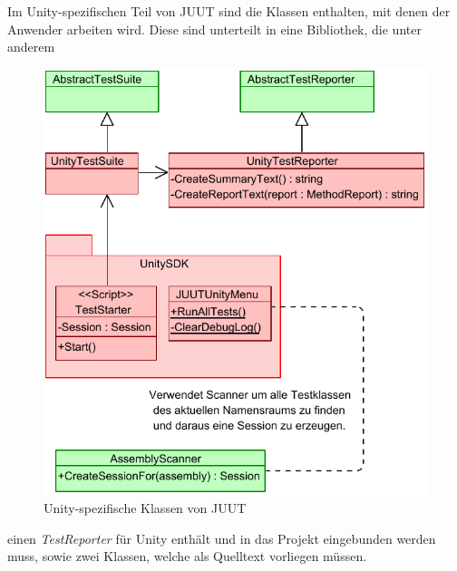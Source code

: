 Im Unity-spezifischen Teil von JUUT sind die Klassen enthalten, mit denen der Anwender arbeiten wird. Diese sind unterteilt in eine Bibliothek, die unter anderem
\begin{figure}
\centering
\includegraphics[width=0.95\linewidth]{images/Kapitel_Ergebnis/Unity}
\caption[Unity-spezifische Klassen von JUUT]{Unity-spezifische Klassen von JUUT}
\label{fig:Unity}
\end{figure}
einen \textit{TestReporter} für Unity enthält und in das Projekt eingebunden werden muss, sowie zwei Klassen, welche als Quelltext vorliegen müssen.


